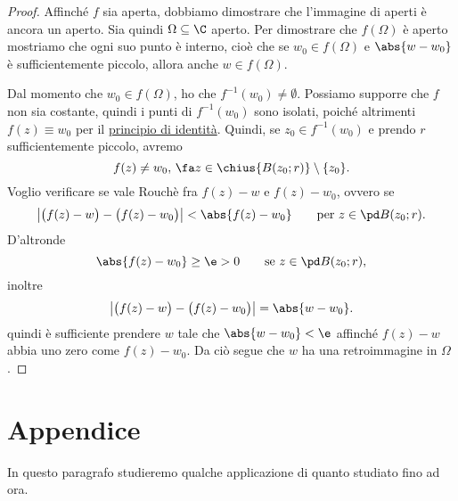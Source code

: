 \begin{proof}
	Affinché \(f\) sia aperta, dobbiamo dimostrare che l'immagine di aperti è ancora un aperto.
	Sia quindi \(\Omega\subseteq \C\) aperto. Per dimostrare che \(f(\Omega)\) è aperto mostriamo che ogni suo punto è interno, cioè che se \(w_0\in f(\Omega)\) e \(\abs{w-w_0}\) è sufficientemente piccolo, allora anche \(w\in f(\Omega)\).

	Dal momento che \(w_0\in f(\Omega)\), ho che \(f^{-1}(w_0)\neq \emptyset\). Possiamo supporre che \(f\) non sia costante, quindi i punti di \(f^{-1}(w_0)\) sono isolati, poiché altrimenti \(f(z)\equiv w_0\) per il \hyperref[th:principioIdentità]{principio di identità}.
	Quindi, se \(z_0\in f^{-1}(w_0)\) e prendo \(r\) sufficientemente piccolo, avremo
	\[
		f(z) \neq w_0,\,\fa z \in \chius{B(z_0;r)}\setminus\{z_0\}.
	\]
	Voglio verificare se vale Rouchè fra \(f(z)-w\) e \(f(z)-w_0\), ovvero se
	\[
		\big\lvert \big(f(z)-w\big)-\big(f(z)-w_0\big) \big\rvert < \abs{f(z)-w_0} \qquad\text{per }z\in \pd B(z_0;r).
	\]
	D'altronde
	\[
		\abs{f(z)-w_0} \ge \e >0 \qquad\text{se }z\in \pd B(z_0;r),
	\]
	inoltre
	\[
		\big\lvert \big(f(z)-w\big)-\big(f(z)-w_0\big) \big\rvert = \abs{w-w_0}.
	\]
	quindi è sufficiente prendere \(w\) tale che \(\abs{w-w_0}<\e\) affinché \(f(z)-w\) abbia uno zero come \(f(z)-w_0\). Da ciò segue che \(w\) ha una retroimmagine in \(\Omega\).
\end{proof}
\section{Appendice}

In questo paragrafo studieremo qualche applicazione di quanto studiato fino ad ora.

